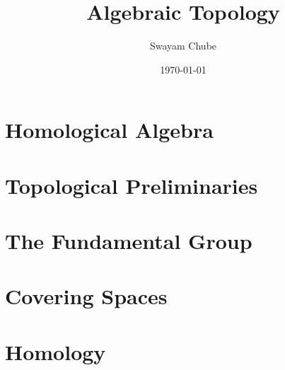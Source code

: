 \documentclass[oneside]{report}
\title{Algebraic Topology}
\author{Swayam Chube}
\date{\today}
\begin{document}
\maketitle
\tableofcontents

\setcounter{chapter}{-1}

\chapter{Homological Algebra}


\chapter{Topological Preliminaries}


\chapter{The Fundamental Group}


\chapter{Covering Spaces}


\chapter{Homology}





\listoftodos
\end{document}
